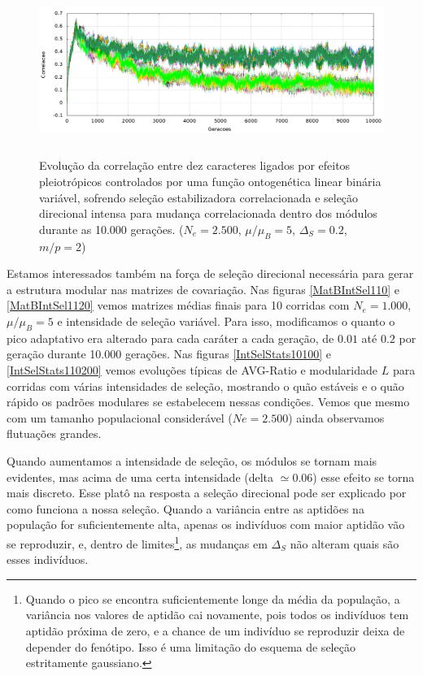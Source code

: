 \begin{figure}[htbp]
  \centering
  \includegraphics[width=150mm, height=55mm]{figuras/direcionalRMu5Ne2500IntSel200.png}
  \caption{Evolução da correlação entre dez caracteres ligados por efeitos
  pleiotrópicos controlados por uma função ontogenética linear binária
  variável, sofrendo seleção estabilizadora correlacionada
  e seleção direcional intensa para mudança correlacionada dentro dos
  módulos durante as 10.000 gerações. 
  ($N_e = 2.500$, $\mu/\mu_B=5$, $\Delta_S=0.2$, $m/p=2$)}
  \label{MatBDirecionalNe2500RMu5}
\end{figure}


Estamos interessados também na força de seleção direcional necessária
para gerar a estrutura modular nas matrizes de covariação. 
Nas figuras \ref{MatBIntSel110} e \ref{MatBIntSel1120} vemos matrizes
médias finais para 10 corridas com $N_e = 1.000$, $\mu/\mu_B=5$ e
intensidade de seleção variável. 
Para isso, modificamos o quanto o pico adaptativo era alterado para cada
caráter a cada geração, de $0.01$ até $0.2$ por geração durante 10.000
gerações. 
Nas figuras \ref{IntSelStats10100} e \ref{IntSelStats110200} vemos
evoluções típicas de AVG-Ratio e modularidade $L$ para corridas com
várias intensidades de seleção, mostrando o quão estáveis e o quão
rápido os padrões modulares se estabelecem nessas condições.
Vemos que mesmo com um tamanho populacional considerável ($Ne = 2.500$)
ainda observamos flutuações grandes. 

Quando aumentamos a intensidade de seleção, os módulos se tornam
mais evidentes, mas acima de uma certa intensidade (delta $\simeq 0.06$)
esse efeito se torna mais discreto. 
Esse platô na resposta a seleção direcional pode ser explicado por como
funciona a nossa seleção. 
Quando a variância entre as aptidões na população for suficientemente
alta, apenas os indivíduos com maior aptidão vão se reproduzir, e,
dentro de limites\footnote{ Quando o pico se encontra suficientemente
longe da média da população, a variância nos valores de aptidão cai
novamente, pois todos os indivíduos tem aptidão próxima de zero, e a
chance de um indivíduo se reproduzir deixa de depender do fenótipo. 
Isso é uma limitação do esquema de seleção estritamente gaussiano.}, as
mudanças em $\Delta_S$ não alteram quais são esses indivíduos. 


